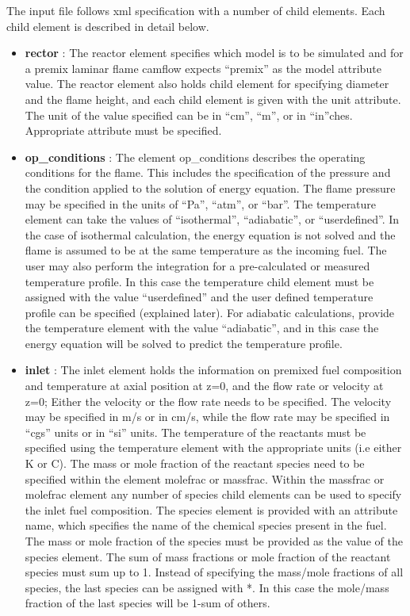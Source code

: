 The input file follows xml specification with a number of child elements. Each child element is described in detail below.

\begin{itemize}
 \item \textbf{rector} : The reactor element specifies which model is to be simulated and for a premix laminar flame camflow expects ``premix'' as the model attribute value. The reactor element also holds child element for specifying diameter and the flame height, and each child element is given with the unit attribute. The unit of the value specified can be in ``cm'', ``m'', or in ``in''ches. Appropriate attribute must be specified.

\item \textbf{op\_conditions} : The element op\_conditions describes the operating conditions for the flame. This includes the specification of the pressure and the condition applied to the solution of energy equation. The flame pressure may be specified in the units of ``Pa'', ``atm'', or ``bar''. The temperature element can take the values of ``isothermal'', ``adiabatic'', or ``userdefined''. In the case of isothermal calculation, the energy equation is not solved and the flame is assumed to be at the same temperature as the incoming fuel. The user may also perform the integration for a pre-calculated or measured temperature profile. In this case the temperature child element must be assigned with the value ``userdefined'' and the user defined temperature profile can be specified (explained later). For adiabatic calculations, provide the temperature element with the value ``adiabatic'', and in this case the energy equation will be solved to predict the temperature profile.

\item \textbf{inlet} : The inlet element holds the information on premixed fuel composition and temperature at axial position at z=0, and the flow rate or velocity at z=0; Either the velocity or the flow rate needs to be specified. The velocity may be specified in m/s or in cm/s, while the flow rate may be specified in ``cgs'' units or in ``si'' units. The temperature of the reactants must be specified using the temperature element with the appropriate units (i.e either K or C). The mass or mole fraction of the reactant species need to be specified within the element molefrac or massfrac. Within the massfrac or molefrac element any number of species child elements can be used to specify the inlet fuel composition. The species element is provided with an attribute name, which specifies the name of the chemical species present in the fuel. The mass or mole fraction of the species must be provided as the value of the species element. The sum of mass fractions or mole fraction of the reactant species must sum up to 1. Instead of specifying the mass/mole fractions of all species, the last species can be assigned with *. In this case the mole/mass fraction of the last species will be 1-sum of others.


\end{itemize}
